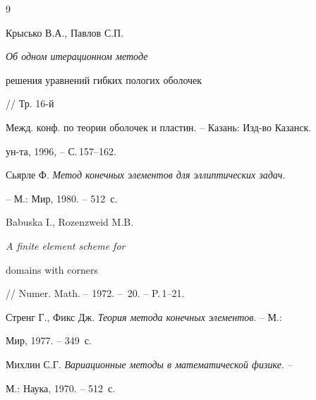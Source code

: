 \begin{thebibliography}{9} 


 




Крысько В.А., Павлов С.П. {\em Об одном итерационном методе 


решения уравнений гибких пологих оболочек} // Тр. 16-й 


Межд. конф. по теории оболочек и пластин. -- Казань: Изд-во Казанск. 


ун-та, 1996, -- С.\,157--162. 




Сьярле Ф. {\em Метод конечных элементов для эллиптических задач}. 


-- М.: Мир, 1980. -- 512~с. 




Babuska I., Rozenzweid M.B. {\em A finite element scheme for 


domains with corners} // Numer. Math. -- 1972. -- \No\,20. -- P.\,1--21. 




Стренг Г., Фикс Дж. {\em Теория метода конечных элементов}. -- М.: 


Мир, 1977. -- 349~с. 




Михлин С.Г. {\em Вариационные методы в математической физике}. -- 


М.: Наука, 1970. -- 512~с. 


 


\end{thebibliography} 


 


\vskip 2cm 


 






 


\label{end} 


 


